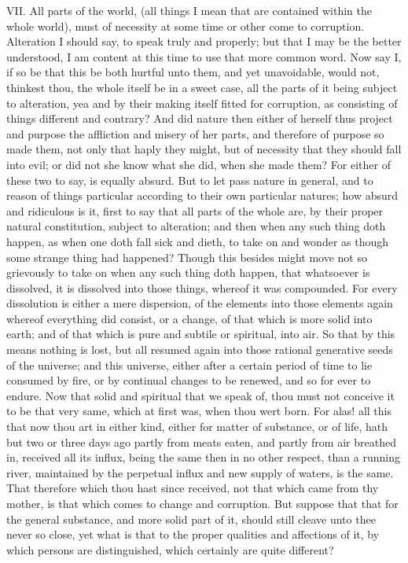 VII. All parts of the world, (all things I mean that are contained
within the whole world), must of necessity at some time or other come to
corruption. Alteration I should say, to speak truly and properly; but that
I may be the better understood, I am content at this time to use that more
common word. Now say I, if so be that this be both hurtful unto them, and
yet unavoidable, would not, thinkest thou, the whole itself be in a sweet
case, all the parts of it being subject to alteration, yea and by their
making itself fitted for corruption, as consisting of things different and
contrary? And did nature then either of herself thus project and purpose
the affliction and misery of her parts, and therefore of purpose so made
them, not only that haply they might, but of necessity that they should
fall into evil; or did not she know what she did, when she made them? For
either of these two to say, is equally absurd. But to let pass nature in
general, and to reason of things particular according to their own
particular natures; how absurd and ridiculous is it, first to say that all
parts of the whole are, by their proper natural constitution, subject to
alteration; and then when any such thing doth happen, as when one doth
fall sick and dieth, to take on and wonder as though some strange thing
had happened? Though this besides might move not so grievously to take on
when any such thing doth happen, that whatsoever is dissolved, it is
dissolved into those things, whereof it was compounded. For every
dissolution is either a mere dispersion, of the elements into those
elements again whereof everything did consist, or a change, of that which
is more solid into earth; and of that which is pure and subtile or
spiritual, into air. So that by this means nothing is lost, but all
resumed again into those rational generative seeds of the universe; and
this universe, either after a certain period of time to lie consumed by
fire, or by continual changes to be renewed, and so for ever to endure.
Now that solid and spiritual that we speak of, thou must not conceive it
to be that very same, which at first was, when thou wert born. For alas!
all this that now thou art in either kind, either for matter of substance,
or of life, hath but two or three days ago partly from meats eaten, and
partly from air breathed in, received all its influx, being the same then
in no other respect, than a running river, maintained by the perpetual
influx and new supply of waters, is the same. That therefore which thou
hast since received, not that which came from thy mother, is that which
comes to change and corruption. But suppose that that for the general
substance, and more solid part of it, should still cleave unto thee never
so close, yet what is that to the proper qualities and affections of it,
by which persons are distinguished, which certainly are quite different?

